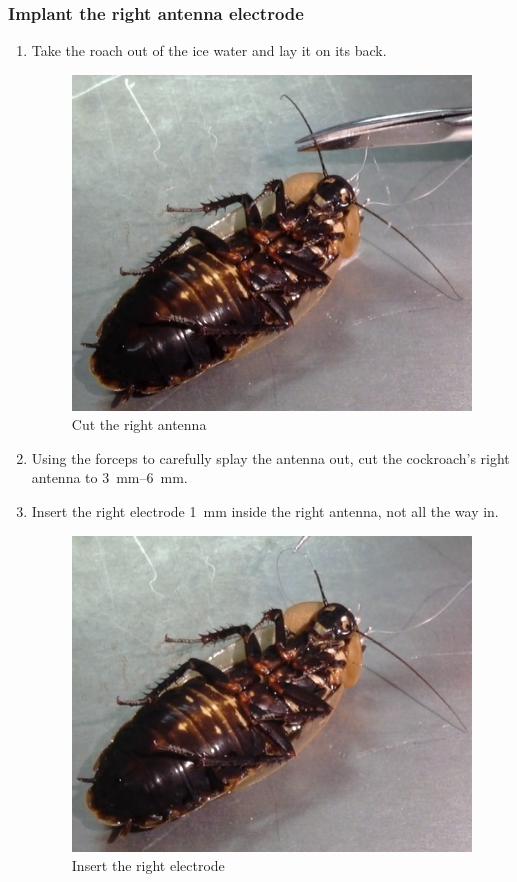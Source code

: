\subsubsection{Implant the right antenna electrode}
\begin{enumerate}
\item Take the roach out of the ice water and lay it on its back.
\begin{figure}[ht!]
\centering
\includegraphics[scale=0.3]{Surgery Photos/cut.jpg}
\caption{Cut the right antenna}
\label{fig:cut}
\end{figure}

\item Using the forceps to carefully splay the antenna out, cut the cockroach's right antenna to \SIrange{3}{6}{\milli\meter}.
\item Insert the right electrode \SI{1}{\milli\meter} inside the right antenna, not all the way in.
\begin{figure}[ht!]
\centering
\includegraphics[scale=0.3]{Surgery Photos/relectrode1.jpg}
\caption{Insert the right electrode}
\label{fig:relectrode1}
\end{figure}


\end{enumerate}
